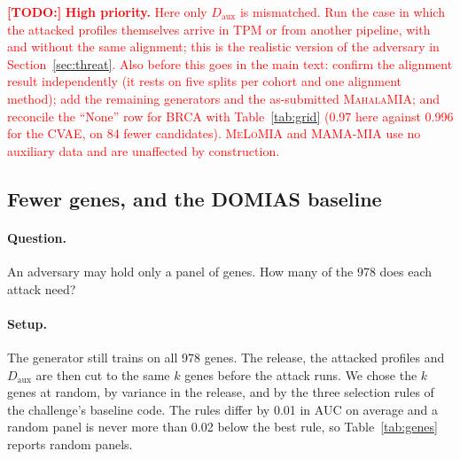 \documentclass[webpdf,contemporary,large]{oup-authoring-template}
\newif\ifdraft \drafttrue
\newcommand{\annot}[3]{\ifdraft\textcolor{#1}{\textbf{[#2:]} #3}\fi}
\newcommand{\todo}[1]{\annot{red}{TODO}{#1}}
\newcommand{\Daux}{D_{\mathrm{aux}}}
\newcommand{\mahala}{\textsc{MahalaMIA}}
\newcommand{\melo}{\textsc{MeLoMIA}}
\newcommand{\mama}{\textsc{MAMA-MIA}}
\begin{document}
\begin{appendices}
\todo{\textbf{High priority.} Here only $\Daux$ is mismatched. Run the case in which the attacked profiles themselves arrive in TPM or from another pipeline, with and without the same alignment; this is the realistic version of the adversary in Section~\ref{sec:threat}. Also before this goes in the main text: confirm the alignment result independently (it rests on five splits per cohort and one alignment method); add the remaining generators and the as-submitted \mahala{}; and reconcile the ``None'' row for BRCA with Table~\ref{tab:grid} (0.97 here against 0.996 for the CVAE, on 84 fewer candidates). \melo{} and \mama{} use no auxiliary data and are unaffected by construction.}

\subsection{Fewer genes, and the DOMIAS baseline}
\label{app:genes}

\paragraph{Question.}
An adversary may hold only a panel of genes. How many of the 978 does each attack need?

\paragraph{Setup.}
The generator still trains on all 978 genes. The release, the attacked profiles and $\Daux$ are then cut to the same $k$ genes before the attack runs. We chose the $k$ genes at random, by variance in the release, and by the three selection rules of the challenge's baseline code. The rules differ by 0.01 in AUC on average and a random panel is never more than 0.02 below the best rule, so Table~\ref{tab:genes} reports random panels.


\end{appendices}
\end{document}
